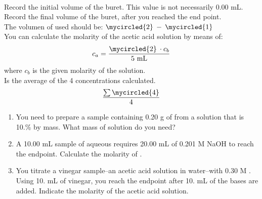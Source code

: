\documentclass[main.tex]{subfiles}
\begin{document}
\newpage
\begin{fullwidth}

\vspace{0.2cm}{\large \bfseries Calculations }\\
 Record the initial volume of the buret. This value is not necessarily 0.00 mL.\vspace{0.5cm}\\
 Record the final volume of the buret, after you reached the end point.\vspace{0.5cm}\\
 The volumen of  used should be: $\mycircled{2} \: - \: \mycircled{1}$ \vspace{0.5cm}\\
 You can calculate the molarity of the acetic acid solution by means of:
\[c_a=\frac{\mycircled{2} \: \cdot c_b}{\text{5 mL}}\]
where $c_b$ is the given molarity of the  solution.\\
 Is the average of the 4 concentrations calculated. \[\frac{\sum{\mycircled{4}}}{4}\]


\vspace{0.2cm}{\large \bfseries PostLab questions }
\begin{enumerate}
\item You need to prepare a sample containing 0.20 g of  from a solution that is 10.\%  by mass. What mass of solution do you need?\vspace{3cm}

\item A 10.00 mL sample of aqueous  requires 20.00 mL of 0.201 M NaOH to reach the endpoint. Calculate the molarity of . \vspace{3cm}

\item You titrate a vinegar sample--an acetic acid solution in water--with 0.30 M . Using 10. mL of vinegar, you reach the endpoint after 10. mL of the bases are added. Indicate the molarity of the acetic acid solution.
\end{enumerate}



\end{fullwidth}
\end{document}
